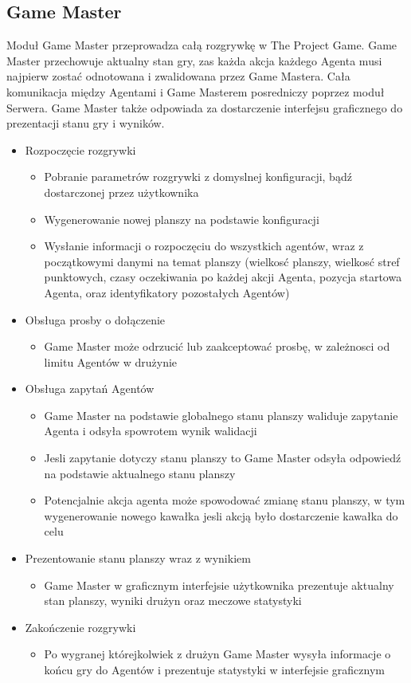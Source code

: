 \documentclass[../Dokumentacja.tex]{subfiles}
\begin{document}
\subsection{Game Master}
Moduł Game Master przeprowadza całą rozgrywkę w The Project Game. Game Master przechowuje aktualny stan gry, 
zas każda akcja każdego Agenta musi najpierw zostać odnotowana i zwalidowana przez Game Mastera.
Cała komunikacja między Agentami i Game Masterem posredniczy poprzez moduł Serwera.
Game Master także odpowiada za dostarczenie interfejsu graficznego do prezentacji stanu gry i wyników.
\begin{itemize}
	\item Rozpoczęcie rozgrywki
	\begin{itemize}
		\item Pobranie parametrów rozgrywki z domyslnej konfiguracji, bądź dostarczonej przez użytkownika
		\item Wygenerowanie nowej planszy na podstawie konfiguracji
		\item Wysłanie informacji o rozpoczęciu do wszystkich agentów, wraz z początkowymi danymi na temat planszy (wielkosć planszy, wielkosć stref punktowych, czasy oczekiwania po każdej akcji Agenta, pozycja startowa Agenta, oraz identyfikatory pozostałych Agentów)
	\end{itemize}
	\item Obsługa prosby o dołączenie
	\begin{itemize}
		\item Game Master może odrzucić lub zaakceptować prosbę, w zależnosci od limitu Agentów w drużynie
	\end{itemize}
	\item Obsługa zapytań Agentów
	\begin{itemize}
		\item Game Master na podstawie globalnego stanu planszy waliduje zapytanie Agenta i odsyła spowrotem wynik walidacji
		\item Jesli zapytanie dotyczy stanu planszy to Game Master odsyła odpowiedź na podstawie aktualnego stanu planszy
		\item Potencjalnie akcja agenta może spowodować zmianę stanu planszy, w tym wygenerowanie nowego kawałka jesli akcją było dostarczenie kawałka do celu
	\end{itemize}
	\item Prezentowanie stanu planszy wraz z wynikiem
	\begin{itemize}
		\item Game Master w graficznym interfejsie użytkownika prezentuje aktualny stan planszy, wyniki drużyn oraz meczowe statystyki
	\end{itemize}
	\item Zakończenie rozgrywki
	\begin{itemize}
		\item Po wygranej którejkolwiek z drużyn Game Master wysyła informacje o końcu gry do Agentów i prezentuje statystyki w interfejsie graficznym
	\end{itemize}
\end{itemize}
\end{document}
